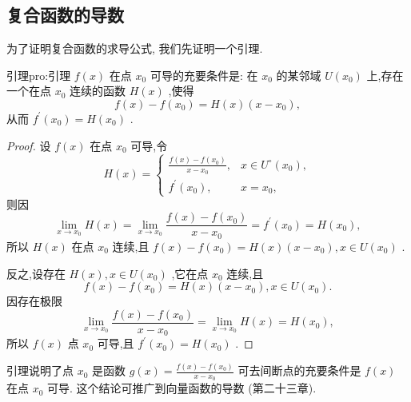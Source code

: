 \subsection{复合函数的导数}

为了证明复合函数的求导公式, 我们先证明一个引理.

\begin{lemma}{引理}{pro:引理}
\(f\left( x\right)\) 在点 \({x}_{0}\) 可导的充要条件是: 在 \({x}_{0}\) 的某邻域 \(U\left( {x}_{0}\right)\) 上,存在一个在点 \({x}_{0}\) 连续的函数 \(H\left( x\right)\) ,使得
\[
f\left( x\right)  - f\left( {x}_{0}\right)  = H\left( x\right) \left( {x - {x}_{0}}\right) ,
\]
从而 \({f}^{\prime }\left( {x}_{0}\right)  = H\left( {x}_{0}\right)\) .
\end{lemma}


\begin{proof}
设 \(f\left( x\right)\) 在点 \({x}_{0}\) 可导,令
\[
H\left( x\right)  = \left\{  \begin{array}{ll} \frac{f\left( x\right)  - f\left( {x}_{0}\right) }{x - {x}_{0}}, & x \in  {U}^{ \circ  }\left( {x}_{0}\right) , \\  {f}^{\prime }\left( {x}_{0}\right) , & x = {x}_{0}, \end{array}\right.
\]
则因
\[
\mathop{\lim }\limits_{{x \rightarrow  {x}_{0}}}H\left( x\right)  = \mathop{\lim }\limits_{{x \rightarrow  {x}_{0}}}\frac{f\left( x\right)  - f\left( {x}_{0}\right) }{x - {x}_{0}} = {f}^{\prime }\left( {x}_{0}\right)  = H\left( {x}_{0}\right) ,
\]
所以 \(H\left( x\right)\) 在点 \({x}_{0}\) 连续,且 \(f\left( x\right)  - f\left( {x}_{0}\right)  = H\left( x\right) \left( {x - {x}_{0}}\right) ,x \in  U\left( {x}_{0}\right)\) .

反之,设存在 \(H\left( x\right) ,x \in  U\left( {x}_{0}\right)\) ,它在点 \({x}_{0}\) 连续,且
\[
f\left( x\right)  - f\left( {x}_{0}\right)  = H\left( x\right) \left( {x - {x}_{0}}\right) ,x \in  U\left( {x}_{0}\right) .
\]
因存在极限
\[
\mathop{\lim }\limits_{{x \rightarrow  {x}_{0}}}\frac{f\left( x\right)  - f\left( {x}_{0}\right) }{x - {x}_{0}} = \mathop{\lim }\limits_{{x \rightarrow  {x}_{0}}}H\left( x\right)  = H\left( {x}_{0}\right) ,
\]
所以 \(f\left( x\right)\) 点 \({x}_{0}\) 可导,且 \({f}^{\prime }\left( {x}_{0}\right)  = H\left( {x}_{0}\right)\) .
\end{proof}


\begin{remark}
引理说明了点 \({x}_{0}\) 是函数 \(g\left( x\right)  = \frac{f\left( x\right)  - f\left( {x}_{0}\right) }{x - {x}_{0}}\) 可去间断点的充要条件是 \(f\left( x\right)\) 在点 \({x}_{0}\) 可导. 这个结论可推广到向量函数的导数 (第二十三章).
\end{remark}


